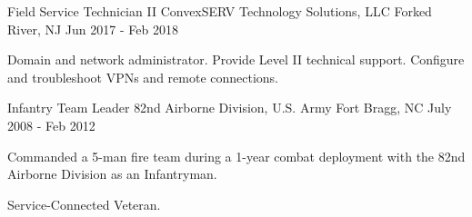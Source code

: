 \begin{cventries}

	\cventry
	{Field Service Technician II}
	{ConvexSERV Technology Solutions, LLC}
	{Forked River, NJ}
	{Jun 2017 - Feb 2018}
	{
		\begin{cvitems}
		\item {Domain and network administrator. Provide Level II technical support. Configure and troubleshoot VPNs and remote connections.}
		\end{cvitems}
	}


	\cventry
	{Infantry Team Leader}
	{82nd Airborne Division, U.S. Army}
	{Fort Bragg, NC}
	{July 2008 - Feb 2012}
	{
		\begin{cvitems}
		\item {Commanded a 5-man fire team during a 1-year combat deployment with the 82nd Airborne Division as an Infantryman.}
		\item {Service-Connected Veteran.}
		\end{cvitems}
	}

\end{cventries}
